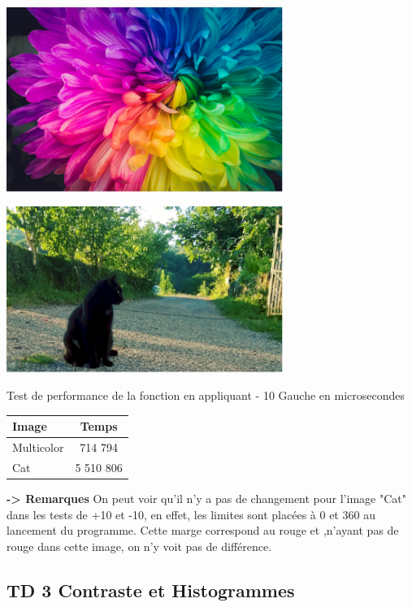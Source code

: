 \documentclass{article}
\begin{document}
\begin{center} 
    \includegraphics[width=9cm]{../Image_fonctions/Multicolor/Selected-10L.PNG}
\end{center}
\begin{center} 
    \includegraphics[width=9cm]{../Image_fonctions/Cat/Selected-10L.PNG}
\end{center}

\begin{center}
\medbreak
Test de performance de la fonction en appliquant - 10 Gauche en microsecondes
\bigbreak
   \begin{tabular}{ | l | c | }
     \hline
     Image & Temps \\
     \hline
     Multicolor & 714 794 \\
     \hline
     Cat & 5 510 806 \\
     \hline
   \end{tabular}
 \end{center}
 
 \bigbreak
 
 \textbf{ -> Remarques}
 On peut voir qu'il n'y a pas de changement pour l'image "Cat" dans les tests de +10 et -10, en effet, les limites sont placées à 0 et 360 au lancement du programme. Cette marge correspond au rouge et ,n'ayant pas de rouge dans cette image, on n'y voit pas de différence.

\newpage
\subsection{TD 3 Contraste et Histogrammes}
\end{document}
